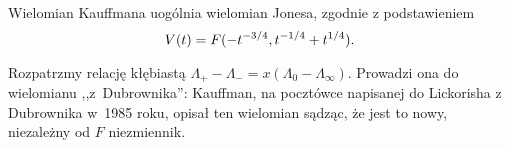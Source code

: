 \begin{proposition}
    Wielomian Kauffmana uogólnia wielomian Jonesa, zgodnie z podstawieniem
    \begin{equation}
        V(t)=F(-t^{-3/4},t^{-1/4}+t^{1/4}).
    \end{equation}
\end{proposition}

Rozpatrzmy relację kłębiastą $\Lambda_+ - \Lambda_- = x(\Lambda_0 - \Lambda_\infty)$.
Prowadzi ona do wielomianu ,,z~Dubrownika'': Kauffman, na pocztówce napisanej do Lickorisha z Dubrownika w~1985 roku, opisał ten wielomian sądząc, że jest to nowy, niezależny od $F$ niezmiennik.



